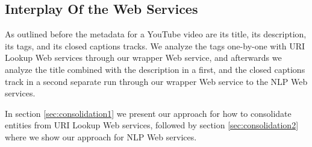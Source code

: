 \documentclass{acm_proc_article-sp}
\begin{document}
\subsection{Interplay Of the Web Services}\label{sec:interplay}
As outlined before the metadata for a YouTube video are its title, its description, its tags, and its closed captions tracks. We analyze the tags one-by-one with URI Lookup Web services through our wrapper Web service, and afterwards we analyze the title combined with the description in a first, and the closed captions track in a second separate run through our wrapper Web service to the NLP Web services.

In section \ref{sec:consolidation1} we present our approach for how to consolidate entities from URI Lookup Web services, followed by section \ref{sec:consolidation2} where we show our approach for NLP Web services.
\end{document}

